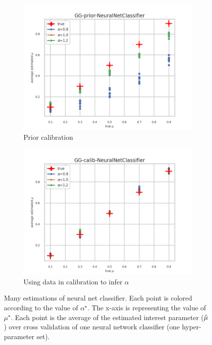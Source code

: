 \begin{figure}[ht!]
  \centering
  \begin{subfigure}[t]{0.49\linewidth}
    \includegraphics[width=\linewidth]{COMPARE/GG-prior/NeuralNetClassifier/profusion_true_mu_target_mean.png}
    \caption{Prior calibration}
  \end{subfigure}%
  \hfill
  \begin{subfigure}[t]{0.49\linewidth}
    \includegraphics[width=\linewidth]{COMPARE/GG-calib/NeuralNetClassifier/profusion_true_mu_target_mean.png}
    \caption{Using data in calibration to infer $\alpha$}
  \end{subfigure}
  \caption{Many estimations of neural net classifier. Each point is colored according to the value of $\alpha^\star$. The x-axis is representing the value of $\mu^\star$. Each point is the average of the estimated interest parameter ($\hat\mu$) over cross validation of one neural network classifier (one hyper-parameter set).}
  \label{fig:gg_baseline_compare_calib_estimator}
\end{figure}


